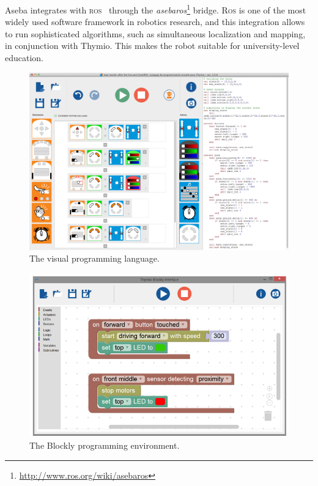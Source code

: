 \documentclass[letterpaper, 10 pt, conference]{ieeeconf}  %
\begin{document}
Aseba integrates with \textsc{ros}~\cite{quigley2009ros} through the \emph{asebaros}\footnote{\url{http://www.ros.org/wiki/asebaros}} bridge.
\textsc{Ros} is one of the most widely used software framework in robotics research, and this integration allows to run sophisticated algorithms, such as simultaneous localization and mapping, in conjunction with  Thymio.
This makes the robot suitable for university-level education.

\begin{figure}
\centering
\includegraphics[width=\columnwidth]{figures/vpl}
\caption{The visual programming language.}
\label{fig:vpl}
\end{figure}

\begin{figure}
\centering
\includegraphics[width=\columnwidth]{figures/blockly}
\caption{The Blockly programming environment.}
\label{fig:blockly}
\end{figure}
\end{document}
